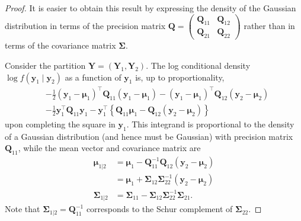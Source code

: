 \documentclass[
  11pt,
  letterpaper,
]{scrbook}
\theoremstyle{definition}
\theoremstyle{plain}
\theoremstyle{plain}
\theoremstyle{definition}
\theoremstyle{definition}
\theoremstyle{remark}
\begin{document}
\begin{proof}
It is easier to obtain this result by expressing the density of the
Gaussian distribution in terms of the precision matrix
\(\boldsymbol{Q}= \left(\begin{smallmatrix}\boldsymbol{Q}_{11} & \boldsymbol{Q}_{12}\\
\boldsymbol{Q}_{21} & \boldsymbol{Q}_{22}\end{smallmatrix}\right)\)
rather than in terms of the covariance matrix \(\boldsymbol{\Sigma}\).

Consider the partition
\(\boldsymbol{Y}=(\boldsymbol{Y}_1, \boldsymbol{Y}_2)\). The log
conditional density \(\log f(\boldsymbol{y}_1 \mid \boldsymbol{y}_2)\)
as a function of \(\boldsymbol{y}_1\) is, up to proportionality,
\begin{align*}
 &-\frac{1}{2}\left(\boldsymbol{y}_1-\boldsymbol{\mu}_1\right)^\top
\boldsymbol{Q}_{11}\left(\boldsymbol{y}_1-\boldsymbol{\mu}_1\right) - \left(\boldsymbol{y}_1-\boldsymbol{\mu}_1\right)^\top 
\boldsymbol{Q}_{12}\left(\boldsymbol{y}_2-\boldsymbol{\mu}_2\right)\\
&-\frac{1}{2}\boldsymbol{y}_1^\top\boldsymbol{Q}_{11}\boldsymbol{y}_1-\boldsymbol{y}_1^\top
\left\{\boldsymbol{Q}_{11}\boldsymbol{\mu}_1-\boldsymbol{Q}_{12}\left(\boldsymbol{y}_2-\boldsymbol{\mu}_2\right)\right\}
\end{align*} upon completing the square in \(\boldsymbol{y}_1\). This
integrand is proportional to the density of a Gaussian distribution (and
hence must be Gaussian) with precision matrix \(\boldsymbol{Q}_{11}\),
while the mean vector and covariance matrix are \begin{align*}
\boldsymbol{\mu}_{1|2} &= 
\boldsymbol{\mu}_1-\boldsymbol{Q}_{11}^{-1}\boldsymbol{Q}_{12}  \left(\boldsymbol{y}_2-\boldsymbol{\mu}_2\right)
\\&=\boldsymbol{\mu}_1+ \boldsymbol{\Sigma}_{12}\boldsymbol{\Sigma}_{22}^{-1}\left(\boldsymbol{y}_2-\boldsymbol{\mu}_2\right)
\\\boldsymbol{\Sigma}_{1|2} &= \boldsymbol{\Sigma}_{11}-\boldsymbol{\Sigma}_{12}\boldsymbol{\Sigma}_{22}^{-1}\boldsymbol{\Sigma}_{21}.
\end{align*} Note that
\(\boldsymbol{\Sigma}_{1|2}=\boldsymbol{Q}_{11}^{-1}\) corresponds to
the Schur complement of \(\boldsymbol{\Sigma}_{22}\).


\end{proof}
\end{document}

